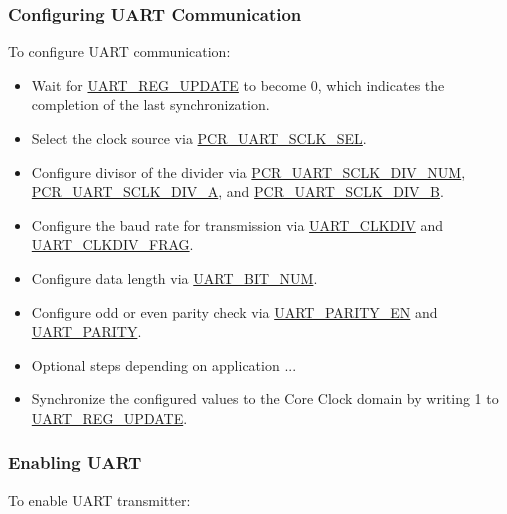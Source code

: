 \documentclass[main\_\_EN.tex]{subfiles}
\begin{document}
\subsubsection{Configuring UART Communication}

To configure UART communication:

\begin{itemize}
    \item Wait for \hyperref[fielddesc:UARTREGUPDATE]{UART\_REG\_UPDATE} to become 0, which indicates the completion of the last synchronization.
    \item Select the clock source via \hyperref[fielddesc:PCRUART0SCLKSEL]{PCR\_UART\_SCLK\_SEL}.
    \item Configure divisor of the divider via \hyperref[fielddesc:PCRUART0SCLKDIVNUM]{PCR\_UART\_SCLK\_DIV\_NUM}, \hyperref[fielddesc:PCRUART0SCLKDIVA]{PCR\_UART\_SCLK\_DIV\_A}, and \hyperref[fielddesc:PCRUART0SCLKDIVB]{PCR\_UART\_SCLK\_DIV\_B}.
    \item Configure the baud rate for transmission via \hyperref[fielddesc:UARTCLKDIV]{UART\_CLKDIV} and \hyperref[fielddesc:UARTCLKDIVFRAG]{UART\_CLKDIV\_FRAG}.
    \item Configure data length via \hyperref[fielddesc:UARTBITNUM]{UART\_BIT\_NUM}.
    \item Configure odd or even parity check via \hyperref[fielddesc:UARTPARITYEN]{UART\_PARITY\_EN} and \hyperref[fielddesc:UARTPARITY]{UART\_PARITY}.
    \item Optional steps depending on application ...
    \item Synchronize the configured values to the Core Clock domain by writing 1 to \hyperref[fielddesc:UARTREGUPDATE]{UART\_REG\_UPDATE}.
\end{itemize}

\subsubsection{Enabling UART}

To enable UART transmitter:
\end{document}
